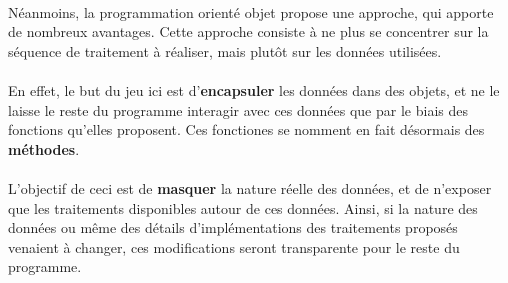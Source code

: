 {  

  \paragraph{} Néanmoins, la programmation orienté objet propose une approche, qui apporte de nombreux
  avantages. Cette approche consiste à ne plus se concentrer sur la séquence de traitement à réaliser,
  mais plutôt sur les données utilisées.

  \paragraph{} En effet, le but du jeu ici est d'\textbf{encapsuler} les données dans des objets, et
  ne le laisse le reste du programme interagir avec ces données que par le biais des fonctions
  qu'elles proposent. Ces fonctiones se nomment en fait désormais des \textbf{méthodes}.

  \paragraph{} L'objectif de ceci est de \textbf{masquer} la nature réelle des données, et de
  n'exposer que les traitements disponibles autour de ces données. Ainsi, si la nature des données ou
  même des détails d'implémentations des traitements proposés venaient à changer, ces modifications
  seront transparente pour le reste du programme.
}


